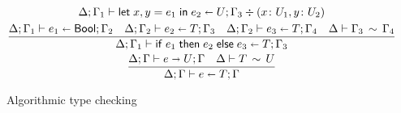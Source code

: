 \begin{figure}[h!]
\begin{gather*}
{    }{
      \algtypein[\kindEnv;
      \varEnv_1]{\binlete{x}{y}{e_1}{e_2}}{U}{\varEnv_3} \div (x\colon U_1, y\colon U_2)
    }
    \\
    \frac{
      \algtypein[\kindEnv;\varEnv_1]{e_1}{\boole}{\varEnv_2}
      \quad
      \algtypein[\kindEnv;\varEnv_2]{e_2}{T}{\varEnv_3}
      \quad
      \algtypein[\kindEnv;\varEnv_2]{e_3}{T}{\varEnv_4}
      \quad
      \ctxequiv{\varEnv_3}{\varEnv_4}
    }{
      \algtypein[\kindEnv;\varEnv_1]{\conditionale{e_1}{e_2}{e_3}}{T}{\varEnv_3}
    }
    \\
        \frac{
      \algtypeout e U \varEnv
      \quad
      \typeequiv T U
    }{
      \algtypein e T \varEnv
    }
  \end{gather*}
  \caption{Algorithmic type checking}
  \label{fig:alg-typing}
\end{figure}

